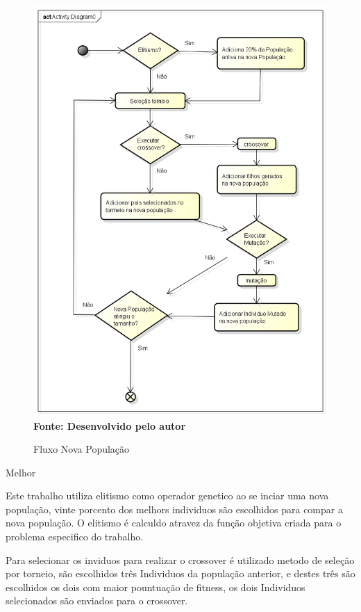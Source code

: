 \documentclass{abntpuc}
\begin{document}
\begin{figure}[!htb]
\caption[Fluxo Nova População]{Fluxo Nova População}
\label{fig:figura8}
\centering
\includegraphics[scale=0.7]{imagens/fluxoNovaPopulacao.png}
\\ \textbf{\footnotesize Fonte: Desenvolvido pelo autor}
\end{figure}



Melhor


Este trabalho utiliza elitismo como operador genetico ao se inciar uma nova população, vinte porcento dos melhors individuos são escolhidos para compar a nova população. O elitismo é calculdo atravez da função objetiva criada para o problema especifico do trabalho.\par

Para selecionar os inviduos para realizar o crossover é utilizado metodo de seleção por torneio, são escolhidos três Individuos da população anterior, e destes três são escolhidos os dois com maior pountuação de fitness, os dois Individuos selecionados são enviados para o crossover.\par
\end{document}
